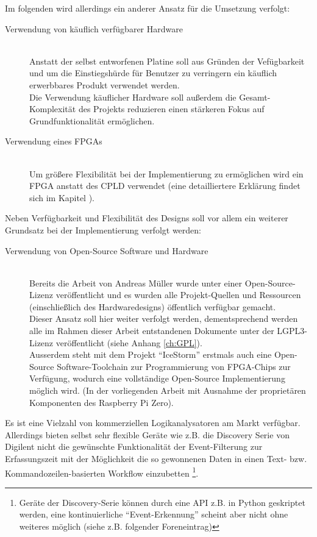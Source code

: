 Im folgenden wird allerdings ein anderer Ansatz für die Umsetzung verfolgt:
\begin{description}
\item[Verwendung von käuflich verfügbarer Hardware] \hfill \\
Anstatt der selbst entworfenen Platine soll aus Gründen der Vefügbarkeit und um die Einstiegshürde für Benutzer zu verringern ein käuflich erwerbbares Produkt verwendet werden.\\
Die Verwendung käuflicher Hardware soll außerdem die Gesamt-Komplexität des Projekts reduzieren einen stärkeren Fokus auf Grundfunktionalität ermöglichen.
\item[Verwendung eines FPGAs] \hfill \\
Um größere Flexibilität bei der Implementierung zu ermöglichen wird ein \gls{FPGA} anstatt des \gls{CPLD} verwendet (eine detailliertere Erklärung findet sich im Kapitel ).
\end{description}

Neben Verfügbarkeit und Flexibilität des Designs soll vor allem ein weiterer Grundsatz bei der Implementierung verfolgt werden:
\begin{description}
\item[Verwendung von Open-Source Software und Hardware] \hfill \\
Bereits die Arbeit von Andreas Müller wurde unter einer Open-Source-Lizenz veröffentlicht und es wurden alle Projekt-Quellen und Ressourcen (einschließlich des Hardwaredesigns) öffentlich verfügbar gemacht.\\
Dieser Ansatz soll hier weiter verfolgt werden, dementsprechend werden alle im Rahmen dieser Arbeit entstandenen Dokumente unter der LGPL3-Lizenz veröffentlicht (siehe Anhang \ref{ch:GPL}).\\
Ausserdem steht mit dem Projekt ``IceStorm'' erstmals auch eine Open-Source Software-Toolchain zur Programmierung von FPGA-Chips zur Verfügung, wodurch eine vollständige Open-Source Implementierung möglich wird. (In der vorliegenden Arbeit mit Ausnahme der proprietären Komponenten des Raspberry Pi Zero).     
\end{description}


Es ist eine Vielzahl von kommerziellen Logikanalysatoren am Markt verfügbar. Allerdings bieten selbst sehr flexible Geräte wie z.B. die Discovery Serie von Digilent nicht die gewünschte Funktionalität der Event-Filterung zur Erfassungszeit mit der Möglichkeit die so gewonnenen Daten in einen Text- bzw. Kommandozeilen-basierten Workflow einzubetten \footnote{Geräte der Discovery-Serie können durch eine \acrshort{API} z.B. in Python geskriptet werden, eine kontinuierliche ``Event-Erkennung'' scheint aber nicht ohne weiteres möglich (siehe z.B. folgender Foreneintrag\cite{forum:digilent}) }. 

